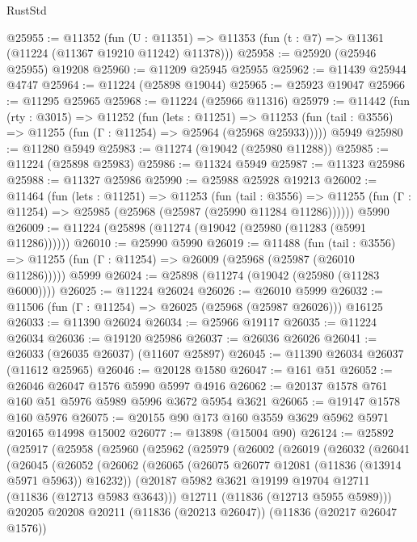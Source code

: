 \begin{lexlean}{RustStd}
\begin{coremodule}
@25955 := @11352
    (fun (U : @11351) => @11353 (fun (t : @7) => @11361 (@11224 (@11367 @19210 @11242) @11378)))
@25958 := @25920 (@25946 @25955) @19208
@25960 := @11209 @25945 @25955
@25962 := @11439 @25944 @4747
@25964 := @11224 (@25898 @19044)
@25965 := @25923 @19047
@25966 := @11295 @25965
@25968 := @11224 (@25966 @11316)
@25979 := @11442
    (fun (rty : @3015) =>
    @11252
      (fun (lets : @11251) =>
      @11253 (fun (tail : @3556) => @11255 (fun (Γ : @11254) => @25964 (@25968 @25933)))))
    @5949
@25980 := @11280 @5949
@25983 := @11274 (@19042 (@25980 @11288))
@25985 := @11224 (@25898 @25983)
@25986 := @11324 @5949
@25987 := @11323 @25986
@25988 := @11327 @25986
@25990 := @25988 @25928 @19213
@26002 := @11464
    (fun (lets : @11251) =>
    @11253
      (fun (tail : @3556) =>
      @11255 (fun (Γ : @11254) => @25985 (@25968 (@25987 (@25990 @11284 @11286))))))
    @5990
@26009 := @11224 (@25898 (@11274 (@19042 (@25980 (@11283 (@5991 @11286))))))
@26010 := @25990 @5990
@26019 := @11488
    (fun (tail : @3556) => @11255 (fun (Γ : @11254) => @26009 (@25968 (@25987 (@26010 @11286)))))
    @5999
@26024 := @25898 (@11274 (@19042 (@25980 (@11283 @6000))))
@26025 := @11224 @26024
@26026 := @26010 @5999
@26032 := @11506 (fun (Γ : @11254) => @26025 (@25968 (@25987 @26026))) @16125
@26033 := @11390 @26024
@26034 := @25966 @19117
@26035 := @11224 @26034
@26036 := @19120 @25986
@26037 := @26036 @26026
@26041 := @26033 (@26035 @26037) (@11607 @25897)
@26045 := @11390 @26034 @26037 (@11612 @25965)
@26046 := @20128 @1580
@26047 := @161 @51
@26052 := @26046 @26047 @1576 @5990 @5997 @4916
@26062 := @20137 @1578 @761 @160 @51 @5976 @5989 @5996 @3672 @5954 @3621
@26065 := @19147 @1578 @160 @5976
@26075 := @20155 @90 @173 @160 @3559 @3629 @5962 @5971 @20165 @14998 @15002
@26077 := @13898 (@15004 @90)
@26124 := @25892
    (@25917
      (@25958
        (@25960
          (@25962
            (@25979
              (@26002
                (@26019
                  (@26032
                    (@26041
                      (@26045
                        (@26052
                          (@26062
                            (@26065 (@26075 @26077 @12081 (@11836 (@13914 @5971 @5963)) @16232))
                            (@20187 @5982 @3621 @19199 @19704 @12711 (@11836 (@12713 @5983 @3643)))
                            @12711
                            (@11836 (@12713 @5955 @5989)))
                          @20205
                          @20208
                          @20211
                          (@11836 (@20213 @26047))
                          (@11836 (@20217 @26047 @1576))

\end{coremodule}
\end{lexlean}
